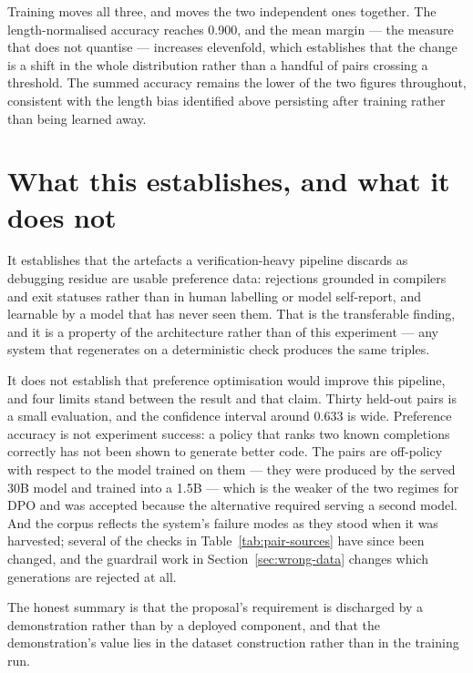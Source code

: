 Training moves all three, and moves the two independent ones together. The
length-normalised accuracy reaches 0.900, and the mean margin --- the measure
that does not quantise --- increases elevenfold, which establishes that the
change is a shift in the whole distribution rather than a handful of pairs
crossing a threshold. The summed accuracy remains the lower of the two figures
throughout, consistent with the length bias identified above persisting after
training rather than being learned away.

\section{What this establishes, and what it does not}
\label{sec:po-limits}

It establishes that the artefacts a verification-heavy pipeline discards as
debugging residue are usable preference data: rejections grounded in compilers
and exit statuses rather than in human labelling or model self-report, and
learnable by a model that has never seen them. That is the transferable finding,
and it is a property of the architecture rather than of this experiment ---
any system that regenerates on a deterministic check produces the same triples.

It does not establish that preference optimisation would improve this pipeline,
and four limits stand between the result and that claim. Thirty held-out pairs
is a small evaluation, and the confidence interval around 0.633 is wide.
Preference accuracy is not experiment success: a policy that ranks two known
completions correctly has not been shown to generate better code. The pairs are
off-policy with respect to the model trained on them --- they were produced by
the served 30B model and trained into a 1.5B --- which is the weaker of the two
regimes for DPO and was accepted because the alternative required serving a
second model. And the corpus reflects the system's failure modes as they stood
when it was harvested; several of the checks in Table~\ref{tab:pair-sources}
have since been changed, and the guardrail work in
Section~\ref{sec:wrong-data} changes which generations are rejected at all.

The honest summary is that the proposal's requirement is discharged by a
demonstration rather than by a deployed component, and that the demonstration's
value lies in the dataset construction rather than in the training run.
